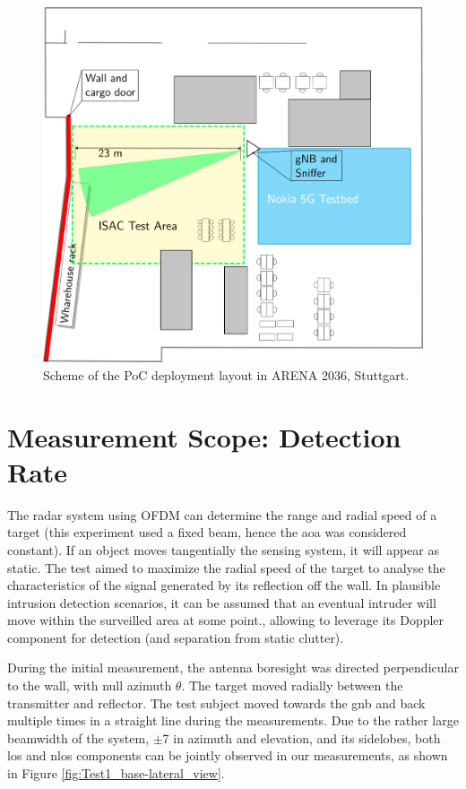 \begin{figure}[H]
	\centering
	\includegraphics[width=.6\textwidth]{Images/Test1/arena_plan}
	\caption{Scheme of the PoC deployment layout in ARENA 2036, Stuttgart.}
	\label{fig:Test1_arena_plan}
\end{figure}


\section{Measurement Scope: Detection Rate}

The radar system using OFDM can determine the range and radial speed of a target (this experiment used a fixed beam, hence the \gls{aoa} was considered constant). If an object moves tangentially \wrt the sensing system, it will appear as static.
The test aimed to maximize the radial speed of the target to analyse the characteristics of the signal generated by its reflection off the wall.
In plausible intrusion detection scenarios, it can be assumed that an eventual intruder will move within the surveilled area at some point., allowing to leverage its Doppler component for detection (and separation from static clutter).

During the initial measurement, the antenna boresight was directed perpendicular to the wall, with null azimuth $\theta$.
The target moved radially between the transmitter and reflector. The test subject moved towards the \gls{gnb} and back multiple times in a straight line during the measurements.
Due to the rather large beamwidth of the system, $\pm$7\textdegree\hspace{1pt} in azimuth and elevation, and its sidelobes, both \gls{los} and \gls{nlos} components can be jointly observed in our measurements, as shown in Figure \ref{fig:Test1_base-lateral_view}.

